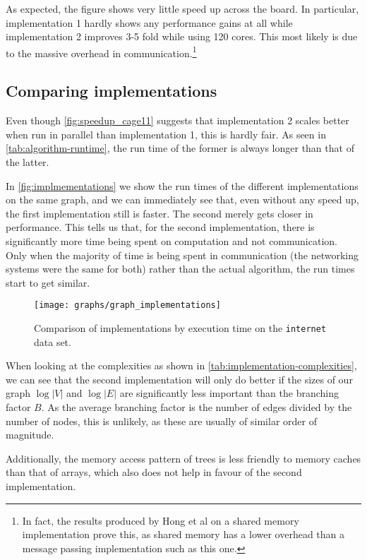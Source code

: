 As expected, the figure shows very little speed up across the board. In particular, implementation 1 hardly shows any performance gains at all while implementation 2 improves 3-5 fold while using 120 cores. This most likely is due to the massive overhead in communication.\footnote{In fact, the results produced by Hong et al \cite{LockFreeMultithreadedMaxFlow} on a shared memory implementation prove this, as shared memory has a lower overhead than a message passing implementation such as this one.}

\subsection{Comparing implementations}
Even though \autoref{fig:speedup_cage11} suggests that implementation 2 scales better when run in parallel than implementation 1, this is hardly fair. As seen in \autoref{tab:algorithm-runtime}, the run time of the former is always longer than that of the latter.

In \autoref{fig:implmementations} we show the run times of the different implementations on the same graph, and we can immediately see that, even without any speed up, the first implementation still is faster. The second merely gets closer in performance. This tells us that, for the second implementation, there is significantly more time being spent on computation and not communication. Only when the majority of time is being spent in communication (the networking systems were the same for both) rather than the actual algorithm, the run times start to get similar.

\begin{figure}[b!]
	\centering
  \texttt{[image: graphs/graph\_implementations]}
  \caption{Comparison of implementations by execution time on the \texttt{internet} data set.}
  \label{fig:implmementations}
\end{figure}

\pagebreak

When looking at the complexities as shown in \autoref{tab:implementation-complexities}, we can see that the second implementation will only do better if the sizes of our graph $\log |V|$ and $\log |E|$ are significantly less important than the branching factor $B$. As the average branching factor is the number of edges divided by the number of nodes, this is unlikely, as these are usually of similar order of magnitude.

Additionally, the memory access pattern of trees is less friendly to memory caches than that of arrays, which also does not help in favour of the second implementation.
